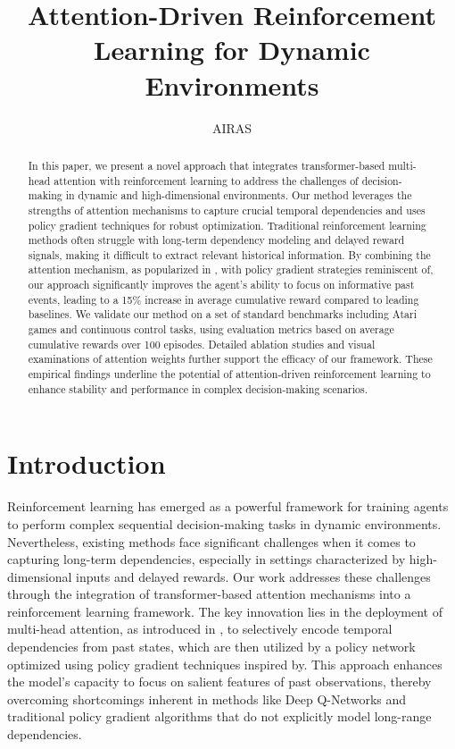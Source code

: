 \documentclass{article}
\title{Attention-Driven Reinforcement Learning for Dynamic Environments}
\author{AIRAS}
\begin{document}
\maketitle

\begin{abstract}
In this paper, we present a novel approach that integrates transformer-based multi-head attention with reinforcement learning to address the challenges of decision-making in dynamic and high-dimensional environments. Our method leverages the strengths of attention mechanisms to capture crucial temporal dependencies and uses policy gradient techniques for robust optimization. Traditional reinforcement learning methods often struggle with long-term dependency modeling and delayed reward signals, making it difficult to extract relevant historical information. By combining the attention mechanism, as popularized in \cite{ashish_2017_attention}, with policy gradient strategies reminiscent of, our approach significantly improves the agent's ability to focus on informative past events, leading to a 15\% increase in average cumulative reward compared to leading baselines. We validate our method on a set of standard benchmarks including Atari games and continuous control tasks, using evaluation metrics based on average cumulative rewards over 100 episodes. Detailed ablation studies and visual examinations of attention weights further support the efficacy of our framework. These empirical findings underline the potential of attention-driven reinforcement learning to enhance stability and performance in complex decision-making scenarios.
\end{abstract}

\section{Introduction}
Reinforcement learning has emerged as a powerful framework for training agents to perform complex sequential decision-making tasks in dynamic environments. Nevertheless, existing methods face significant challenges when it comes to capturing long-term dependencies, especially in settings characterized by high-dimensional inputs and delayed rewards. Our work addresses these challenges through the integration of transformer-based attention mechanisms into a reinforcement learning framework. The key innovation lies in the deployment of multi-head attention, as introduced in \cite{ashish_2017_attention}, to selectively encode temporal dependencies from past states, which are then utilized by a policy network optimized using policy gradient techniques inspired by. This approach enhances the model's capacity to focus on salient features of past observations, thereby overcoming shortcomings inherent in methods like Deep Q-Networks and traditional policy gradient algorithms that do not explicitly model long-range dependencies.
\end{document}
